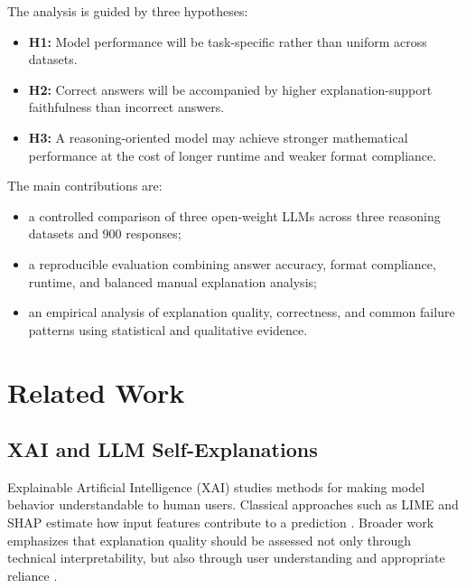 \documentclass{article}
\begin{document}
The analysis is guided by three hypotheses:

\begin{itemize}
    \item \textbf{H1:} Model performance will be task-specific rather
    than uniform across datasets.

    \item \textbf{H2:} Correct answers will be accompanied by higher
    explanation-support faithfulness than incorrect answers.

    \item \textbf{H3:} A reasoning-oriented model may achieve stronger
    mathematical performance at the cost of longer runtime and weaker
    format compliance.
\end{itemize}

The main contributions are:

\begin{itemize}
    \item a controlled comparison of three open-weight LLMs across
    three reasoning datasets and 900 responses;

    \item a reproducible evaluation combining answer accuracy, format
    compliance, runtime, and balanced manual explanation analysis;

    \item an empirical analysis of explanation quality, correctness,
    and common failure patterns using statistical and qualitative
    evidence.
\end{itemize}




\section{Related Work}

\subsection{XAI and LLM Self-Explanations}

Explainable Artificial Intelligence (XAI) studies methods for making
model behavior understandable to human users. Classical approaches such
as LIME and SHAP estimate how input features contribute to a prediction
\cite{ribeiro2016trust,lundberg2017unified}. Broader work emphasizes
that explanation quality should be assessed not only through technical
interpretability, but also through user understanding and appropriate
reliance
\cite{lipton2018mythos,molnar2022interpretable,
miller2019explanation,brahman2022human}.
\end{document}
